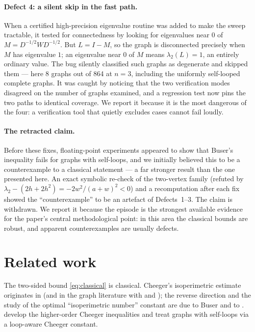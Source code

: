 \documentclass[11pt,a4paper]{article}
\theoremstyle{plain}
\theoremstyle{definition}
\begin{document}
\paragraph{Defect 4: a silent skip in the fast path.}
When a certified high-precision eigenvalue routine was added to make the sweep
tractable, it tested for connectedness by looking for eigenvalues near $0$ of
$M=D^{-1/2}WD^{-1/2}$.  But $L=I-M$, so the graph is disconnected precisely
when $M$ has eigenvalue \emph{$1$}; an eigenvalue near $0$ of $M$ means
$\lambda_2(L)=1$, an entirely ordinary value.  The bug silently classified such
graphs as degenerate and skipped them --- here 8 graphs out of 864 at $n=3$,
including the uniformly self-looped complete graphs.  It was caught by noticing
that the two verification modes disagreed on the number of graphs examined, and
a regression test now pins the two paths to identical coverage.  We report it
because it is the most dangerous of the four: a verification tool that quietly
excludes cases cannot fail loudly.

\paragraph{The retracted claim.}
Before these fixes, floating-point experiments appeared to show that Buser's
inequality fails for graphs with self-loops, and we initially believed this to
be a counterexample to a classical statement --- a far stronger result than the
one presented here.  An exact symbolic re-check of the two-vertex family
(refuted by $\lambda_2-(2h+2h^2)=-2w^2/(a+w)^2<0$) and a recomputation after
each fix showed the ``counterexample'' to be an artefact of Defects~1--3.  The
claim is withdrawn.  We report it because the episode is the strongest
available evidence for the paper's central methodological point: in this area
the classical bounds are robust, and apparent counterexamples are usually
defects.

\section{Related work}\label{sec:related}

The two-sided bound \eqref{eq:classical} is classical.  Cheeger's isoperimetric
estimate originates in \cite{chung1997} (and in the graph literature with
\cite{alon1985} and \cite{dodziuk1984}); the reverse direction and the study
of the optimal ``isoperimetric number'' constant are due to Buser and to
\cite{mohar1988,mohar1989}.  \cite{lee2014} develop the higher-order Cheeger
inequalities and treat graphs with self-loops via a loop-aware Cheeger constant.
\end{document}
